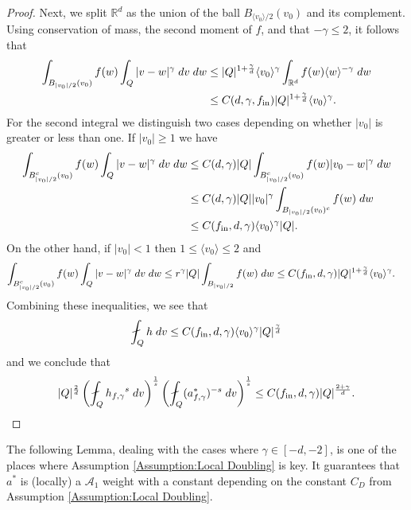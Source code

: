 \documentclass[12pt,american]{amsart}
\numberwithin{equation}{section}
\theoremstyle{plain}
\theoremstyle{definition}                  %
\def\astar{{a^*}}
\def\fin{f_{\textnormal{in}}}
\begin{document}
\begin{proof}
 
 Next, we split $\mathbb{R}^d$ as the union of the ball  $B_{\langle v_0\rangle/2}(v_0)$ and its complement. Using conservation of mass, the second moment of $f$, and that $-\gamma\leq 2$, it follows that
   \begin{align*}
  \int_{B_{|v_0|/2}(v_0)} f(w) \int_Q |v-w|^{\gamma}\;dv\;dw  & \leq |Q|^{1+\frac{\gamma}{d}}\langle v_0 \rangle^{\gamma} \int_{\mathbb{R}^d}f(w)\langle w\rangle^{-\gamma}\;dw\\
	 & \leq C(d,\gamma,\fin)|Q|^{1+\frac{\gamma}{d}} \langle v_0\rangle^{\gamma}.
  \end{align*}
  For the second integral we distinguish two cases depending on whether $|v_0|$ is greater or less than one. 
  If $|v_0| \ge 1$ we have 
  \begin{align*}
  \int_{B_{|v_0|/2}^c(v_0)} f(w) \int_Q |v-w|^{\gamma}\;dv\;dw &\le C(d,\gamma) |Q|   \int_{B_{|v_0|/2}^c(v_0)}f(w)|v_0-w|^{\gamma}\;dw \\
  & \leq C(d,\gamma)|Q| | v_0|^{\gamma} \int_{B_{|v_0|/2}(v_0)^c}f(w)\;dw\\
	  & \leq  C(\fin,d,\gamma)\langle v_0\rangle^{\gamma}|Q|.
  \end{align*}
  On the other hand, if $|v_0| < 1$ then $1\leq \langle v_0\rangle \le 2$ and 
   \begin{align*}
  \int_{B_{|v_0|/2}^c(v_0)} f(w) \int_Q |v-w|^{\gamma}\;dv\;dw  & \leq  r^\gamma |Q| \int_{B_{|v_0|/2}} f(w)\;dw \leq   C(\fin,d,\gamma) |Q|^{1+\frac{\gamma}{d}} \langle v_0\rangle^{\gamma}.
  \end{align*}
  Combining these inequalities, we see that 
  \begin{align}\label{hwithr=1}
   \fint_{Q}h\;dv  \le C(\fin,d,\gamma)\langle v_0\rangle^{\gamma} |Q|^{\frac{\gamma}{d}} 
  \end{align}
  and  we conclude that
   \begin{align*}
    |Q|^{\frac{2}{d}} \left( \fint_{Q}{h_{f,\gamma}}^s\;dv\right)^{\frac{1}{s}}\left(\fint_{Q}(a_{f,\gamma}^*)^{-s}\;dv\right)^{\frac{1}{s}} \leq C(\fin,d,\gamma)   |Q|^{\frac{2+\gamma}{d}}. 
    \end{align*}
\end{proof}

The following Lemma, dealing with the cases where $\gamma \in [-d,-2]$, is one of the places where Assumption \ref{Assumption:Local Doubling} is key. It guarantees that $\astar$ is (locally) a $\mathcal{A}_1$ weight with a constant depending on the constant $C_D$ from Assumption \ref{Assumption:Local Doubling}.
\end{document}
